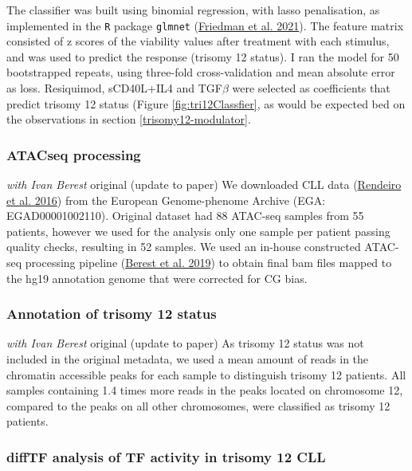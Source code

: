 \documentclass[11pt, a4paper, twosided]{book}
\begin{document}
The classifier was built using binomial regression, with lasso penalisation, as implemented in the \texttt{R} package \texttt{glmnet} (\protect\hyperlink{ref-R-glmnet}{Friedman et al. 2021}). The feature matrix consisted of z scores of the viability values after treatment with each stimulus, and was used to predict the response (trisomy 12 status). I ran the model for 50 bootstrapped repeats, using three-fold cross-validation and mean absolute error as loss. Resiquimod, sCD40L+IL4 and TGF\(\beta\) were selected as coefficients that predict trisomy 12 status (Figure \ref{fig:tri12Classfier}, as would be expected bed on the observations in section \ref{trisomy12-modulator}.

\hypertarget{atacseq-processing}{%
\subsubsection{ATACseq processing}\label{atacseq-processing}}

\emph{with Ivan Berest} original (update to paper)
We downloaded CLL data (\protect\hyperlink{ref-Rendeiro2016}{Rendeiro et al. 2016}) from the European Genome-phenome Archive (EGA: EGAD00001002110). Original dataset had 88 ATAC-seq samples from 55 patients, however we used for the analysis only one sample per patient passing quality checks, resulting in 52 samples. We used an in-house constructed ATAC-seq processing pipeline (\protect\hyperlink{ref-Berest2019}{Berest et al. 2019}) to obtain final bam files mapped to the hg19 annotation genome that were corrected for CG bias.

\hypertarget{annotation-of-trisomy-12-status}{%
\subsubsection{Annotation of trisomy 12 status}\label{annotation-of-trisomy-12-status}}

\emph{with Ivan Berest} original (update to paper)
As trisomy 12 status was not included in the original metadata, we used a mean amount of reads in the chromatin accessible peaks for each sample to distinguish trisomy 12 patients. All samples containing 1.4 times more reads in the peaks located on chromosome 12, compared to the peaks on all other chromosomes, were classified as trisomy 12 patients.

\hypertarget{difftf-analysis-of-tf-activity-in-trisomy-12-cll}{%
\subsubsection{diffTF analysis of TF activity in trisomy 12 CLL}\label{difftf-analysis-of-tf-activity-in-trisomy-12-cll}}
\end{document}
